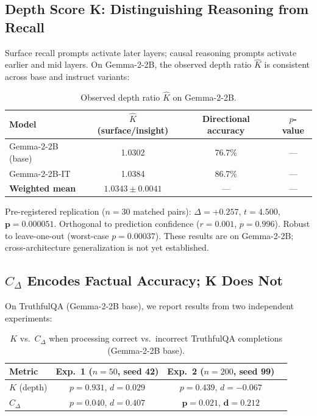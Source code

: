 \documentclass[10pt]{article}
\begin{document}
\subsection{Depth Score K: Distinguishing Reasoning from Recall}

Surface recall prompts activate later layers; causal reasoning prompts activate earlier and mid layers. On Gemma-2-2B, the observed depth ratio $\hat{K}$ is consistent across base and instruct variants:

\begin{table}[h]
\centering
\caption{Observed depth ratio $\hat{K}$ on Gemma-2-2B.}
\begin{tabular}{lccc}
\toprule
Model & $\hat{K}$ (surface/insight) & Directional accuracy & $p$-value \\
\midrule
Gemma-2-2B (base) & 1.0302 & 76.7\% & --- \\
Gemma-2-2B-IT & 1.0384 & 86.7\% & --- \\
\textbf{Weighted mean} & $\mathbf{1.0343 \pm 0.0041}$ & --- & --- \\
\bottomrule
\end{tabular}
\end{table}

Pre-registered replication ($n{=}30$ matched pairs): $\Delta = +0.257$, $t = 4.500$, $\mathbf{p = 0.000051}$. Orthogonal to prediction confidence ($r = 0.001$, $p = 0.996$). Robust to leave-one-out (worst-case $p = 0.00037$). These results are on Gemma-2-2B; cross-architecture generalization is not yet established.

\subsection{$C_{\Delta}$ Encodes Factual Accuracy; K Does Not}

On TruthfulQA (Gemma-2-2B base), we report results from two independent experiments:

\begin{table}[h]
\centering
\caption{$K$ vs.\ $C_{\Delta}$ when processing correct vs.\ incorrect TruthfulQA completions (Gemma-2-2B base).}
\begin{tabular}{lccc}
\toprule
Metric & Exp.\ 1 ($n{=}50$, seed 42) & Exp.\ 2 ($n{=}200$, seed 99) \\
\midrule
$K$ (depth) & $p = 0.931$, $d = 0.029$ & $p = 0.439$, $d = -0.067$ \\
$C_{\Delta}$ & $p = 0.040$, $d = 0.407$ & $\mathbf{p = 0.021}$, $\mathbf{d = 0.212}$ \\
\bottomrule
\end{tabular}
\end{table}
\end{document}
